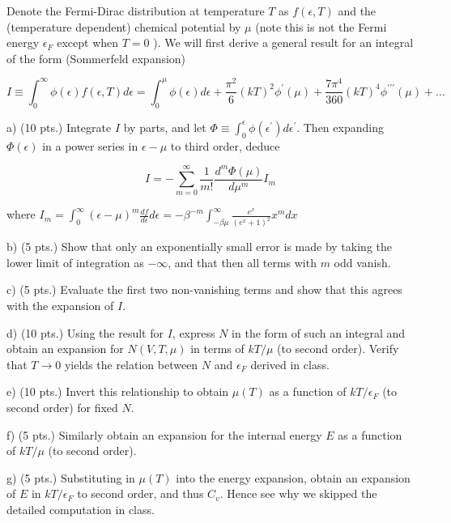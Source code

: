 \documentclass[10pt]{article}
\begin{document}
Denote the Fermi-Dirac distribution at temperature $T$ as $f(\epsilon, T)$ and the (temperature dependent) chemical potential by $\mu$ (note this is not the Fermi energy $\epsilon_{F}$ except when $T=0$ ). We will first derive a general result for an integral of the form (Sommerfeld expansion)


\begin{equation*}
I \equiv \int_{0}^{\infty} \phi(\epsilon) f(\epsilon, T) d \epsilon=\int_{0}^{\mu} \phi(\epsilon) d \epsilon+\frac{\pi^{2}}{6}(k T)^{2} \phi^{\prime}(\mu)+\frac{7 \pi^{4}}{360}(k T)^{4} \phi^{\prime \prime \prime}(\mu)+\ldots \tag{3}
\end{equation*}


a) (10 pts.) Integrate $I$ by parts, and let $\Phi \equiv \int_{0}^{\epsilon} \phi\left(\epsilon^{\prime}\right) d \epsilon^{\prime}$. Then expanding $\Phi(\epsilon)$ in a power series in $\epsilon-\mu$ to third order, deduce


\begin{equation*}
I=-\sum_{m=0}^{\infty} \frac{1}{m !} \frac{d^{m} \Phi(\mu)}{d \mu^{m}} I_{m} \tag{4}
\end{equation*}


where $I_{m}=\int_{0}^{\infty}(\epsilon-\mu)^{m} \frac{d f}{d \epsilon} d \epsilon=-\beta^{-m} \int_{-\beta \mu}^{\infty} \frac{e^{x}}{\left(e^{x}+1\right)^{2}} x^{m} d x$

b) (5 pts.) Show that only an exponentially small error is made by taking the lower limit of integration as $-\infty$, and that then all terms with $m$ odd vanish.

c) (5 pts.) Evaluate the first two non-vanishing terms and show that this agrees with the expansion of $I$.

d) (10 pts.) Using the result for $I$, express $N$ in the form of such an integral and obtain an expansion for $N(V, T, \mu)$ in terms of $k T / \mu$ (to second order). Verify that $T \rightarrow 0$ yields the relation between $N$ and $\epsilon_{F}$ derived in class.

e) (10 pts.) Invert this relationship to obtain $\mu(T)$ as a function of $k T / \epsilon_{F}$ (to second order) for fixed $N$.

f) (5 pts.) Similarly obtain an expansion for the internal energy $E$ as a function of $k T / \mu$ (to second order).

g) (5 pts.) Substituting in $\mu(T)$ into the energy expansion, obtain an expansion of $E$ in $k T / \epsilon_{F}$ to second order, and thus $C_{v}$. Hence see why we skipped the detailed computation in class.
\end{document}
